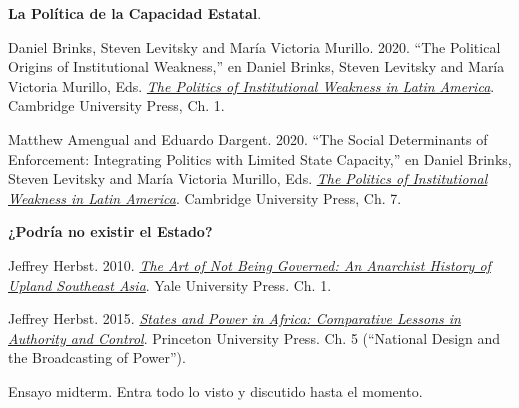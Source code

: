 \documentclass[letterpaper]{article}
\renewenvironment{itemize}{
  \begin{list}{}{
    \setlength{\leftmargin}{1.5em}
  }
}{
  \end{list}
}
\begin{document}
\begin{enumerate}[label=\roman*.]
\begin{itemize}
			\item[9.] {\bf La Pol\'itica de la Capacidad Estatal}.
				\begin{itemize}
					\item[$\circ$] Daniel Brinks, Steven Levitsky and Mar\'ia Victoria Murillo. 2020. ``The Political Origins of Institutional Weakness,'' en Daniel Brinks, Steven Levitsky and Mar\'ia Victoria Murillo, Eds. \href{https://github.com/hbahamonde/Ciencia_Politica_II/raw/master/Readings/Brinks_Levitsky_Murillo.pdf}{\emph{The Politics of Institutional Weakness in Latin America}}. Cambridge University Press, Ch. 1.
					\item[$\circ$] Matthew Amengual and Eduardo Dargent. 2020. ``The Social Determinants of Enforcement: Integrating Politics with Limited State Capacity,'' en Daniel Brinks, Steven Levitsky and Mar\'ia Victoria Murillo, Eds. \href{https://github.com/hbahamonde/Ciencia_Politica_II/raw/master/Readings/Brinks_Levitsky_Murillo.pdf}{\emph{The Politics of Institutional Weakness in Latin America}}. Cambridge University Press, Ch. 7.
				\end{itemize}



		\item[10.] {\bf ¿Podr\'ia no existir el Estado?}
				\begin{itemize}
          \item[$\circ$] Jeffrey Herbst. 2010. \href{https://github.com/hbahamonde/Ciencia_Politica_II/raw/master/Readings/Scott.pdf}{\emph{The Art of Not Being Governed: An Anarchist History of Upland Southeast Asia}}. Yale University Press. Ch. 1.
					\item[$\circ$] Jeffrey Herbst. 2015. \href{https://github.com/hbahamonde/Ciencia_Politica_II/raw/master/Readings/Herbst.pdf}{\emph{States and Power in Africa: Comparative Lessons in Authority and Control}}. Princeton University Press. Ch. 5 (``National Design and the Broadcasting of Power'').
        		\end{itemize}	



		\end{itemize}

\item[{\color{red}\Pointinghand}] Ensayo midterm. Entra todo lo visto y discutido hasta el momento.


	\item {}
		\begin{itemize}


\end{itemize}
\end{enumerate}
\end{document}
